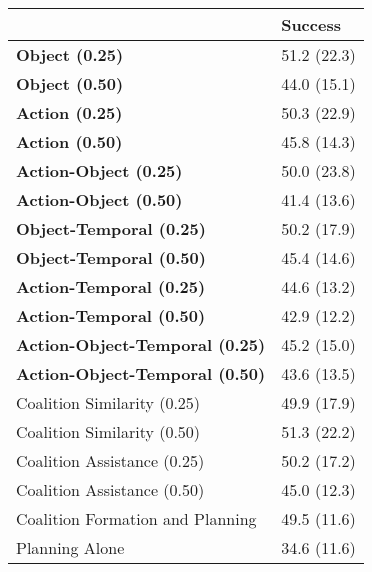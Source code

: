 \begin{tabular}{ll}
\hline
                                        & Success     \\
\hline
 \textbf{Object (0.25)}                 & 51.2 (22.3) \\
 \textbf{Object (0.50)}                 & 44.0 (15.1) \\
 \textbf{Action (0.25)}                 & 50.3 (22.9) \\
 \textbf{Action (0.50)}                 & 45.8 (14.3) \\
 \textbf{Action-Object (0.25)}          & 50.0 (23.8) \\
 \textbf{Action-Object (0.50)}          & 41.4 (13.6) \\
 \textbf{Object-Temporal (0.25)}        & 50.2 (17.9) \\
 \textbf{Object-Temporal (0.50)}        & 45.4 (14.6) \\
 \textbf{Action-Temporal (0.25)}        & 44.6 (13.2) \\
 \textbf{Action-Temporal (0.50)}        & 42.9 (12.2) \\
 \textbf{Action-Object-Temporal (0.25)} & 45.2 (15.0) \\
 \textbf{Action-Object-Temporal (0.50)} & 43.6 (13.5) \\
 Coalition Similarity (0.25)            & 49.9 (17.9) \\
 Coalition Similarity (0.50)            & 51.3 (22.2) \\
 Coalition Assistance (0.25)            & 50.2 (17.2) \\
 Coalition Assistance (0.50)            & 45.0 (12.3) \\
 Coalition Formation and Planning       & 49.5 (11.6) \\
 Planning Alone                         & 34.6 (11.6) \\
\hline
\end{tabular}
